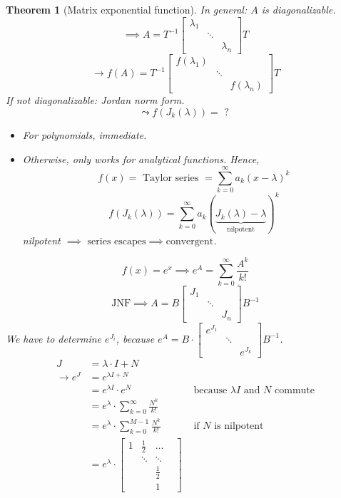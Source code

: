 \documentclass{article}
\newcounter{lecref}[section]
\numberwithin{lecref}{section}
\newtheorem{theorem}[lecref]{Theorem}
\begin{document}
\begin{theorem}[Matrix exponential function] %
  In general: $A$ is diagonalizable.
  \[ \implies A = T^{-1} \begin{bmatrix} \lambda_1 & & \\ & \ddots & \\ & & \lambda_n \end{bmatrix} T \]
  \[ \to f(A) = T^{-1} \begin{bmatrix} f(\lambda_1) & & \\ & \ddots & \\ & & f(\lambda_n) \end{bmatrix} T \]
  If not diagonalizable: Jordan norm form.
  \[ \leadsto f(J_k(\lambda)) = \text{ ? } \]
  \begin{itemize}
    \item For polynomials, immediate.
    \item Otherwise, only works for analytical functions. Hence,
      \[ f(x) = \text{ Taylor series } = \sum_{k=0}^\infty a_k (x - \lambda)^k \]
      \[ f(J_k(\lambda)) = \sum_{k=0}^\infty a_k (\underbrace{J_k(\lambda) - \lambda}_{\text{nilpotent}})^k \]
      nilpotent $\implies \text{ series escapes} \implies \text{convergent}$.
  \end{itemize}

  \[ f(x) = e^x \implies e^A = \sum_{k=0}^\infty \frac{A^k}{k!} \]
  \[ \text{JNF} \implies A = B \begin{bmatrix} J_1 & & \\ & \ddots & \\ & & J_n \end{bmatrix} B^{-1} \]
  We have to determine $e^{J_i}$, because $e^A = B \cdot \begin{bmatrix} e^{J_1} & & \\ & \ddots & \\ & & e^{J_k} \end{bmatrix} B^{-1}$.
  \begin{align*}
    J &= \lambda \cdot I + N \\
    \to e^{J} &= e^{\lambda I + N} \\
      &= e^{\lambda I} \cdot e^N & \text{ because } \lambda I \text{ and } N \text{ commute} \\
      &= e^{\lambda} \cdot \sum_{k=0}^\infty \frac{N^k}{k!} \\
      &= e^{\lambda} \cdot \sum_{k=0}^{M-1} \frac{N^k}{k!} & \text{ if $N$ is nilpotent} \\
      &= e^{\lambda} \cdot \begin{bmatrix} 1 & \frac12 & \dots & \\ & \ddots & \ddots & \\ & & \frac12 & \\ & & 1 & \end{bmatrix}
  \end{align*}
\end{theorem}
\end{document}
